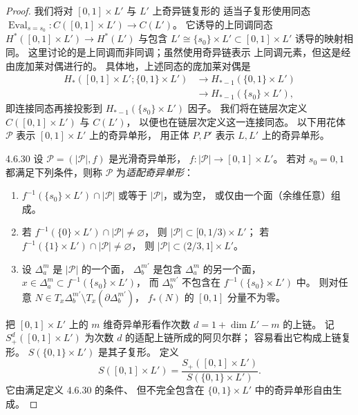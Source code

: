\begin{proof}
我们将对 $[0,1]\times L'$ 与 $L'$ 上奇异链复形的
适当子复形使用同态
$\operatorname{Eval}_{s=s_0}\colon
C([0,1]\times L')\to C(L')$。
它诱导的上同调同态
$H^*([0,1]\times L')\to H^*(L')$
与包含 $L'\cong\{s_0\}\times L'\subset[0,1]\times L'$
诱导的映射相同。
这里讨论的是上同调而非同调；虽然使用奇异链表示
上同调元素，但这是经由庞加莱对偶进行的。
具体地，上述同态的庞加莱对偶是
\[
\begin{aligned}
H_*([0,1]\times L';\{0,1\}\times L')
&\longrightarrow H_{*-1}(\{0,1\}\times L')\\
&\longrightarrow H_{*-1}(\{s_0\}\times L'),
\end{aligned}
\]
即连接同态再接投影到
$H_{*-1}(\{s_0\}\times L')$ 因子。
我们将在链层次定义
$C([0,1]\times L')$ 与 $C(L')$，
以便也在链层次定义这一连接同态。
以下用花体 $\mathcal P$ 表示
$[0,1]\times L'$ 上的奇异单形，
用正体 $P,P'$ 表示 $L,L'$ 上的奇异单形。

\begin{definition}{4.6.30}\label{def:4-6-30}
设 $\mathcal P=(|\mathcal P|,f)$ 是光滑奇异单形，
$f\colon|\mathcal P|\to[0,1]\times L'$。
若对 $s_0=0,1$ 都满足下列条件，则称
$\mathcal P$ 为\emph{适配奇异单形}：
\begin{enumerate}[label=\textup{(4.6.31.\arabic*)},leftmargin=5.9em]
 \item
 $f^{-1}(\{s_0\}\times L')\cap|\mathcal P|$
 或等于 $|\mathcal P|$，或为空，
 或仅由一个面（余维任意）组成。
 \item
 若
 $f^{-1}(\{0\}\times L')\cap|\mathcal P|\ne\varnothing$，
 则
 $|\mathcal P|\subset[0,1/3)\times L'$；
 若
 $f^{-1}(\{1\}\times L')\cap|\mathcal P|\ne\varnothing$，
 则
 $|\mathcal P|\subset(2/3,1]\times L'$。
 \item
 设 $\Delta_a^m$ 是 $|\mathcal P|$ 的一个面，
 $\Delta_b^{m'}$ 是包含 $\Delta_a^m$ 的另一个面，
 $x\in\Delta_a^m\subset f^{-1}(\{s_0\}\times L')$，
 而 $\Delta_b^{m'}$ 不包含在
 $f^{-1}(\{s_0\}\times L')$ 中。
 则对任意
 $N\in T_x\Delta_b^{m'}\setminus
 T_x(\partial\Delta_b^{m'})$，
 $f_*(N)$ 的 $[0,1]$ 分量不为零。
\end{enumerate}
\end{definition}

把 $[0,1]\times L'$ 上的 $m$ 维奇异单形看作次数
$d=1+\dim L'-m$ 的上链。
记 $S_+^d([0,1]\times L')$ 为次数 $d$
的适配上链所成的阿贝尔群；
容易看出它构成上链复形。
$S(\{0,1\}\times L')$ 是其子复形。
定义
\[
S([0,1]\times L')
=\frac{S_+([0,1]\times L')}
{S(\{0,1\}\times L')}.
\]
它由满足定义 4.6.30 的条件、
但不完全包含在 $\{0,1\}\times L'$
中的奇异单形自由生成。


\end{proof}
